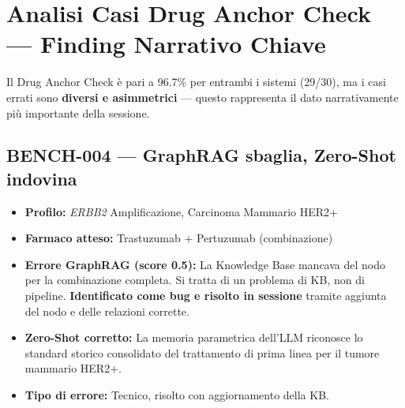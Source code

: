 \documentclass[12pt, a4paper]{article}
\begin{document}
\section{Analisi Casi Drug Anchor Check --- Finding Narrativo Chiave}
Il Drug Anchor Check è pari a 96.7\% per entrambi i sistemi (29/30), ma i casi errati sono \textbf{diversi e asimmetrici} --- questo rappresenta il dato narrativamente più importante della sessione.

\subsection*{BENCH-004 --- GraphRAG sbaglia, Zero-Shot indovina}
\begin{itemize}[leftmargin=1.5em, itemsep=2pt]
  \item \textbf{Profilo:} \textit{ERBB2} Amplificazione, Carcinoma Mammario HER2+
  \item \textbf{Farmaco atteso:} Trastuzumab + Pertuzumab (combinazione)
  \item \textbf{Errore GraphRAG (score 0.5):} La Knowledge Base mancava del nodo per la combinazione completa. Si tratta di un problema di KB, non di pipeline. \textbf{Identificato come bug e risolto in sessione} tramite aggiunta del nodo e delle relazioni corrette.
  \item \textbf{Zero-Shot corretto:} La memoria parametrica dell'LLM riconosce lo standard storico consolidato del trattamento di prima linea per il tumore mammario HER2+.
  \item \textbf{Tipo di errore:} Tecnico, risolto con aggiornamento della KB.
\end{itemize}
\end{document}
